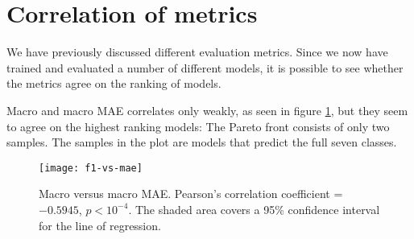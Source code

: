 \section{Correlation of metrics}

We have previously discussed different evaluation metrics. Since we now have
trained and evaluated a number of different models, it is possible to see whether
the metrics agree on the ranking of models.

Macro \FI and macro \ac{MAE} correlates only weakly, as seen in figure
\ref{fig:f1-vs-mae}, but they seem to agree on the highest ranking models:
The Pareto front consists of only two samples. The samples in the plot are
models that predict the full seven classes.

\begin{figure}
  \centering
  \texttt{[image: f1-vs-mae]}
  \caption[Macro \FI versus macro MAE]{
    Macro \FI versus macro MAE. Pearson's correlation coefficient = $-0.5945$,
    $p < 10^{-4}$. The shaded area covers a 95\% confidence interval for the
    line of regression.
  }
  \label{fig:f1-vs-mae}
\end{figure}
